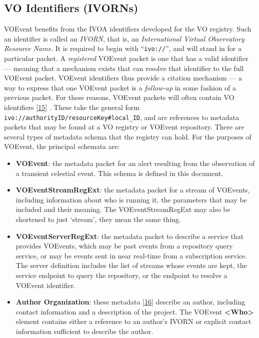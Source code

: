 \documentclass[11pt,a4paper]{ivoa}
\begin{document}
\subsection{VO Identifiers (IVORNs)}
\label{sec:2.2}
VOEvent benefits from the IVOA identifiers developed for the VO registry. Such an identifier is called an \emph{IVORN}, that is, an \emph{International Virtual Observatory Resource Name}. It is required to begin with ``{\tt ivo://}'', and will stand in for a particular packet. A \emph{registered} VOEvent packet is one that has a valid identifier --- meaning that a mechanism exists that can resolve that identifier to the full VOEvent packet. VOEvent identifiers thus provide a citation mechanism --- a way to express that one VOEvent packet is a \emph{follow-up} in some fashion of a previous packet. For these reasons, VOEvent packets will often contain VO identifiers [\hyperref[bib15]{15}]
. These take the general form {\tt ivo://authorityID/resourceKey\#local\_ID}, and are references to metadata packets that may be found at a VO registry or VOEvent repository. There are several types of metadata schema that the registry can hold. For the purposes of VOEvent, the principal schemata are:
\begin{itemize}
\item {\bf VOEvent}: the metadata packet for an alert resulting from the observation of a transient celestial event. This schema is defined in this document. 
\item {\bf VOEventStreamRegExt}: the metadata packet for a stream of VOEvents, including information about who is running it, the parameters that may be included and their meaning. The VOEventStreamRegExt may also be shortened to just `stream', they mean the same thing. 
\item {\bf VOEventServerRegExt}: the metadata packet to describe a service that provides VOEvents, which may be past events from a repository query service, or may be events sent in near real-time from a subscription service. The server definition includes the list of streams whose events are kept, the service endpoint to query the repository, or the endpoint to resolve a VOEvent identifier. 
\item {\bf Author Organization}: these metadata [\hyperref[bib16]{16}]
 describe an author, including contact information and a description of the project. The VOEvent {\bf <Who>} element contains either a reference to an author's IVORN or explicit contact information sufficient to describe the author. 
\end{itemize}
\end{document}
